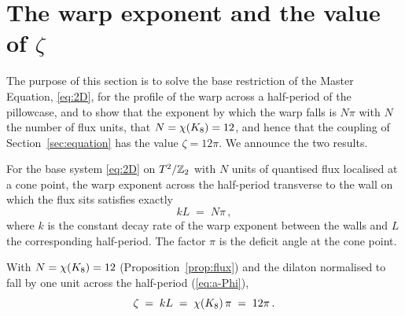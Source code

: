 
\section{The warp exponent and the value of $\zeta$}\label{sec:warp}

The purpose of this section is to solve the base restriction of the Master
Equation, \eqref{eq:2D}, for the profile of the warp across a half-period
of the pillowcase, and to show that the exponent by which the warp falls is
$N\pi$ with $N$ the number of flux units, that $N=\chi(K_8)=12$, and
hence that the coupling of Section~\ref{sec:equation} has the value
$\zeta=12\pi$. We announce the two results.

\begin{theorem}\label{thm:warp-exponent}
For the base system \eqref{eq:2D} on $T^2/\mathbb{Z}_2$ with $N$ units of
quantised flux localised at a cone point, the warp exponent across the
half-period transverse to the wall on which the flux sits satisfies
exactly
\begin{equation}\label{eq:kL-Npi}
  kL\;=\;N\pi\,,
\end{equation}
where $k$ is the constant decay rate of the warp exponent between the
walls and $L$ the corresponding half-period. The factor $\pi$ is the
deficit angle at the cone point.
\end{theorem}

\begin{corollary}\label{cor:zeta}
With $N=\chi(K_8)=12$ (Proposition~\ref{prop:flux}) and the dilaton
normalised to fall by one unit across the half-period (\eqref{eq:a-Phi}),
\begin{equation}\label{eq:zeta}
  \zeta\;=\;kL\;=\;\chi(K_8)\,\pi\;=\;12\pi\,.
\end{equation}
\end{corollary}

